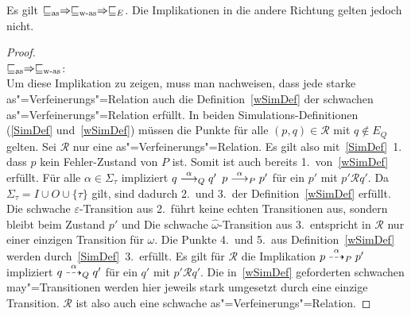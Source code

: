 \begin{Satz}
  Es gilt $\sqsubseteq _{\mathrm{as}} \Rightarrow \sqsubseteq _{\mathrm{w}\text{-}\mathrm{as}} \Rightarrow  \sqsubseteq  _E$. Die Implikationen in
  die andere Richtung gelten jedoch nicht.
\end{Satz}
\begin{proof}\mbox{}\\
  $\sqsubseteq _{\mathrm{as}} \Rightarrow \sqsubseteq _{\mathrm{w}\text{-}\mathrm{as}}$:\\
  Um diese Implikation zu zeigen, muss man nachweisen, dass jede starke
  as"=Verfeinerungs"=Relation auch die Definition~\ref{wSimDef} der schwachen
  as"=Verfeinerungs"=Relation erfüllt. In beiden Simulations-Definitionen
  (\ref{SimDef} und~\ref{wSimDef}) müssen die Punkte für alle $(p,q) \in
  \mathcal{R}$ mit $q\notin E_Q$ gelten. Sei $\mathcal{R}$ nur eine
  as"=Verfeinerungs"=Relation. Es gilt also mit~\ref{SimDef}~1.\, dass $p$ kein
  Fehler-Zustand von $P$ ist. Somit ist auch bereits 1.\ von~\ref{wSimDef}
  erfüllt. Für alle $\alpha\in\Sigma _{\tau}$ impliziert $q\must[\alpha]_Q q'$
  $p\must[\alpha]_P p'$ für ein $p'$ mit $p'\mathcal{R} q'$. Da $\Sigma
  _{\tau} = I \cup O \cup \{\tau\}$ gilt, sind dadurch 2.\ und 3.\ der
  Definition~\ref{wSimDef} erfüllt. Die schwache $\varepsilon$-Transition aus
  2.\ führt keine echten Transitionen aus, sondern bleibt beim Zustand $p'$ und
  Die schwache $\hat{\omega}$-Transition aus 3.\ entspricht in $\mathcal{R}$
  nur einer einzigen Transition für $\omega$. Die Punkte 4.\ und 5.\ aus
  Definition~\ref{wSimDef} werden durch~\ref{SimDef}~3.\ erfüllt. Es gilt für
  $\mathcal{R}$ die Implikation $p\may[\alpha]_P p'$ impliziert $q
  \may[\alpha]_Q q'$ für ein $q'$ mit $p'\mathcal{R}q'$. Die in~\ref{wSimDef}
  geforderten schwachen may"=Transitionen werden hier jeweils stark umgesetzt
  durch eine einzige Transition. $\mathcal{R}$ ist also auch eine schwache
  as"=Verfeinerungs"=Relation.


\end{proof}
